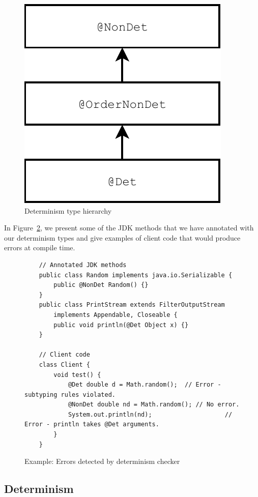 \begin{figure}
    \begin{center}
        \includegraphics[scale=0.5]{determinism}
    \end{center}
    \caption{Determinism type hierarchy}
    \label{fig-determinism-hierarchy}
\end{figure}

In Figure~\ref{code-determinism}, we present some of the JDK methods that we have annotated with our determinism types and give examples of
client code that would produce errors at compile time.
\begin{figure}
    \begin{verbatim}
    // Annotated JDK methods
    public class Random implements java.io.Serializable {
        public @NonDet Random() {}
    }
    public class PrintStream extends FilterOutputStream 
        implements Appendable, Closeable {
        public void println(@Det Object x) {}
    }
    
    // Client code
    class Client {
        void test() {
            @Det double d = Math.random();  // Error - subtyping rules violated.
            @NonDet double nd = Math.random(); // No error.
            System.out.println(nd);                    // Error - println takes @Det arguments.
        }
    }
    \end{verbatim}
    \caption{Example: Errors detected by determinism checker}
    \label{code-determinism}
\end{figure}

\subsection{Determinism}

